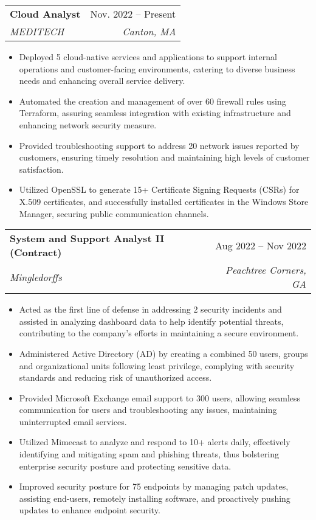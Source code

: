 \documentclass[letterpaper,11pt]{article}
\makeatletter
\newcommand{\resumeItem}[1]{
  \item\small{
    {#1 \vspace{-2pt}}
  }
}
\newcommand{\resumeSubheading}[4]{
  \vspace{-2pt}\item
    \begin{tabular*}{0.97\textwidth}[t]{l@{\extracolsep{\fill}}r}
      \textbf{#1} & #2 \\
      \textit{\small#3} & \textit{\small #4} \\
    \end{tabular*}\vspace{-7pt}
}
\newcommand{\resumeItemListStart}{\begin{itemize}}
\newcommand{\resumeItemListEnd}{\end{itemize}\vspace{-5pt}}
\makeatother
\begin{document}
    \resumeSubheading
      {Cloud Analyst}{Nov. 2022 -- Present}
      {MEDITECH}{Canton, MA}
      \resumeItemListStart
        \resumeItem{Deployed 5 cloud-native services and applications to support internal operations and customer-facing environments, catering to diverse business needs and enhancing overall service delivery.}
        \resumeItem{Automated the creation and management of over 60 firewall rules using Terraform, assuring seamless integration with existing infrastructure and enhancing network security measure.}
        \resumeItem{Provided troubleshooting support to address 20 network issues reported by customers, ensuring timely resolution and maintaining high levels of customer satisfaction.}
        \resumeItem{Utilized OpenSSL to generate 15+ Certificate Signing Requests (CSRs) for X.509 certificates, and successfully installed certificates in the Windows Store Manager, securing public communication channels.}
    \resumeItemListEnd

    \resumeSubheading
      {System and Support Analyst II (Contract)}{Aug 2022 -- Nov 2022}
      {Mingledorffs}{Peachtree Corners, GA}
      \resumeItemListStart
        \resumeItem{Acted as the first line of defense in addressing 2 security incidents and assisted in analyzing dashboard data to help identify potential threats, contributing to the company's efforts in maintaining a secure environment.}
        \resumeItem{Administered Active Directory (AD) by creating a combined 50 users, groups and organizational units following least privilege, complying with security standards and reducing risk of unauthorized access.}
        \resumeItem{Provided Microsoft Exchange email support to 300 users, allowing seamless communication for users and troubleshooting any issues, maintaining uninterrupted email services.}
        \resumeItem{Utilized Mimecast to analyze and respond to 10+ alerts daily, effectively identifying and mitigating spam and phishing threats, thus bolstering enterprise security posture and protecting sensitive data.}
        \resumeItem{Improved security posture for 75 endpoints by managing patch updates, assisting end-users, remotely installing software, and proactively pushing updates to enhance endpoint security.} 
    \resumeItemListEnd
\end{document}
